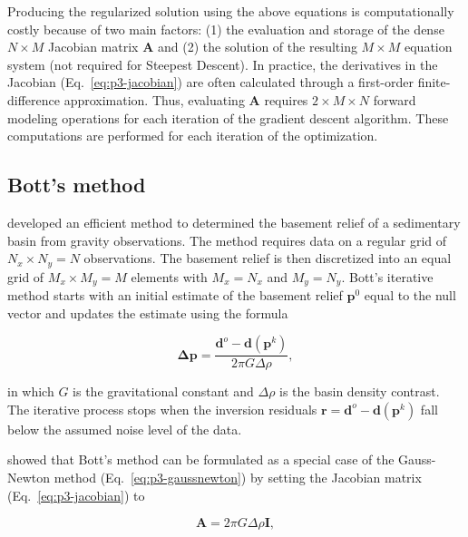 Producing the regularized solution using the above equations is computationally
costly because of two main factors:
(1) the evaluation and storage of the dense $N \times M$ Jacobian matrix
$\mathbf{A}$
and (2) the solution of the resulting $M \times M$ equation system
(not required for Steepest Descent).
In practice, the derivatives in the Jacobian (Eq.~\ref{eq:p3-jacobian})
are often calculated through a first-order finite-difference approximation.
Thus, evaluating $\mathbf{A}$ requires $2\times M \times N$ forward modeling
operations for each iteration of the gradient descent algorithm.
These computations are performed for each iteration of the optimization.


\subsection{Bott's method}

\citet{bott1960} developed an efficient method to determined the basement
relief of a sedimentary basin from gravity observations.
The method requires data on a regular grid of $N_x \times N_y = N$
observations.
The basement relief is then discretized into an equal grid of $M_x \times
M_y = M$ elements with $M_x = N_x$ and $M_y = N_y$.
Bott's iterative method starts with an initial estimate of the basement relief
$\mathbf{p}^0$ equal to the null vector and updates the estimate using the formula

\begin{equation}
    \mathbf{\Delta p} = \dfrac{\mathbf{d}^o - \mathbf{d}(\mathbf{p}^k)}{2\pi G \Delta \rho},
    \label{eq:p3-bott}
\end{equation}

\noindent
in which $G$ is the gravitational constant and $\Delta \rho$ is the basin
density contrast.
The iterative process stops when the inversion residuals
$\mathbf{r} = \mathbf{d}^o - \mathbf{d}(\mathbf{p}^k)$ fall below the assumed noise level
of the data.

\citet{silva2014} showed that Bott's method can be formulated as
a special case of the Gauss-Newton method (Eq.~\ref{eq:p3-gaussnewton})
by setting the Jacobian matrix (Eq.~\ref{eq:p3-jacobian}) to

\begin{equation}
    \mathbf{A} = 2\pi G \Delta \rho \mathbf{I},
    \label{eq:p3-bott-gaussnewton}
\end{equation}

